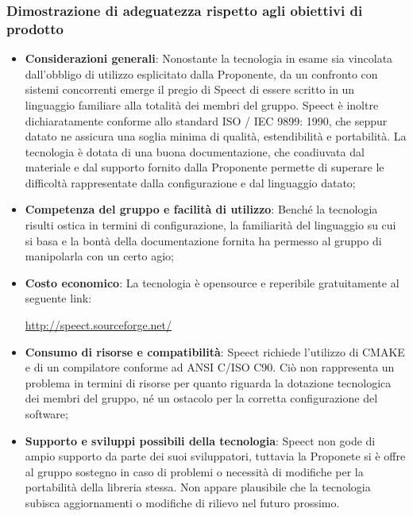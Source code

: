 \documentclass[./../Technology Baseline.tex]{subfiles}
\begin{document}
\subsubsection{Dimostrazione di adeguatezza rispetto agli obiettivi di prodotto}
\begin{itemize}
	\item \textbf{Considerazioni generali}: Nonostante la tecnologia in esame sia vincolata dall'obbligo di utilizzo esplicitato dalla Proponente, da un confronto con sistemi concorrenti emerge il pregio di Speect di essere scritto in un linguaggio familiare alla totalità dei membri del gruppo. Speect è inoltre dichiaratamente conforme allo standard ISO / IEC 9899: 1990, che seppur datato ne assicura una soglia minima di qualità, estendibilità e portabilità. La tecnologia è dotata di una buona documentazione, che coadiuvata dal materiale e dal supporto fornito dalla Proponente permette di superare le difficoltà rappresentate dalla configurazione e dal linguaggio datato;
	
	\item \textbf{Competenza del gruppo e facilità di utilizzo}: Benché la tecnologia risulti ostica in termini di configurazione, la familiarità del linguaggio su cui si basa e la bontà della documentazione fornita ha permesso al gruppo di manipolarla con un certo agio;
	
	\item \textbf{Costo economico}: La tecnologia è opensource e reperibile gratuitamente al seguente link:
	\begin{center}
		\url{http://speect.sourceforge.net/}
	\end{center}

	\item \textbf{Consumo di risorse e compatibilità}: Speect richiede l'utilizzo di CMAKE e di un compilatore conforme ad ANSI C/ISO C90. Ciò non rappresenta un problema in termini di risorse per quanto riguarda la dotazione tecnologica dei membri del gruppo, né un ostacolo per la corretta configurazione del software;
	
	\item \textbf{Supporto e sviluppi possibili della tecnologia}: Speect non gode di ampio supporto da parte dei suoi sviluppatori, tuttavia la Proponete si è offre al gruppo sostegno in caso di problemi o necessità di modifiche per la portabilità della libreria stessa. Non appare plausibile che la tecnologia subisca aggiornamenti o modifiche di rilievo nel futuro prossimo.
\end{itemize}
\end{document}
